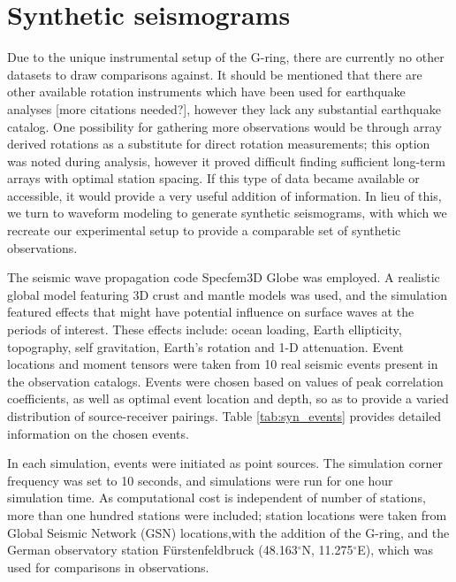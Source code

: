\documentclass{gji}
\begin{document}
\section{Synthetic seismograms}
Due to the unique instrumental setup of the G-ring, there are currently no other datasets to draw comparisons against. It should be mentioned that there are other available rotation instruments which have been used for earthquake analyses \cite{donner2017comparing} [more citations needed?], however they lack any substantial earthquake catalog. One possibility for gathering more observations would be through array derived rotations as a substitute for direct rotation measurements; this option was noted during analysis, however it proved difficult finding sufficient long-term arrays with optimal station spacing. If this type of data became available or accessible, it would provide a very useful addition of information. In lieu of this, we turn to waveform modeling to generate synthetic seismograms, with which we recreate our experimental setup to provide a comparable set of synthetic observations.

The seismic wave propagation code Specfem3D Globe was employed. A realistic global model featuring 3D crust and mantle models was used, and the simulation featured effects that might have potential influence on surface waves at the periods of interest. These effects include: ocean loading, Earth ellipticity, topography, self gravitation, Earth's rotation and 1-D attenuation. Event locations and moment tensors were taken from 10 real seismic events present in the observation catalogs. Events were chosen based on values of peak correlation coefficients, as well as optimal event location and depth, so as to provide a varied distribution of source-receiver pairings. Table \ref{tab:syn_events} provides detailed information on the chosen events. 

In each simulation, events were initiated as point sources. The simulation corner frequency was set to 10 seconds, and simulations were run for one hour simulation time. As computational cost is independent of number of stations, more than one hundred stations were included; station locations were taken from Global Seismic Network (GSN) locations,with the addition of the G-ring, and the German observatory station F\"urstenfeldbruck (48.163$^\circ$N, 11.275$^\circ$E), which was used for comparisons in observations.
\end{document}
